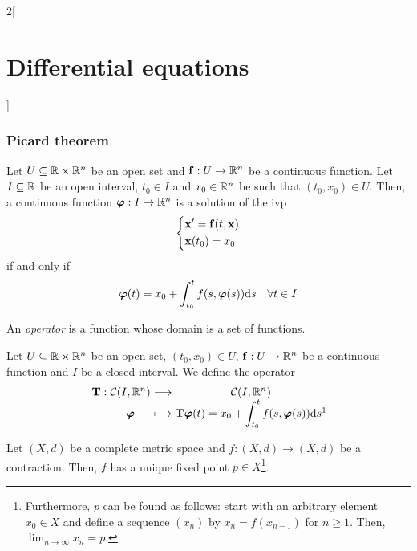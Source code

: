 \documentclass[../../../main.tex]{subfiles}
\begin{document}
\begin{multicols}{2}[\section{Differential equations}]
  \subsubsection{Picard theorem}
  \begin{prop}
    Let $U\subseteq\mathbb{R}\times\mathbb{R}^n$ be an open set and $\boldsymbol{\mathrm{f}}:U\rightarrow\mathbb{R}^n$ be a continuous function. Let $I\subseteq\mathbb{R}$ be an open interval, $t_0\in I$ and $x_0\in\mathbb{R}^n$ be such that $(t_0,x_0)\in U$. Then, a continuous function $\boldsymbol{\mathrm{\varphi}}:I\rightarrow\mathbb{R}^n$ is a solution of the ivp
    \begin{equation}
      \left\{
      \begin{aligned}
         & \boldsymbol{\mathrm{x}}'=\boldsymbol{\mathrm{f}}(t,\boldsymbol{\mathrm{x}}) \\
         & \boldsymbol{\mathrm{x}}(t_0)=x_0
      \end{aligned}
      \right.
      \label{DE_ivp}
    \end{equation}
    if and only if $$\boldsymbol{\mathrm{\varphi}}(t)=x_0+\int_{t_0}^tf(s,\boldsymbol{\mathrm{\varphi}}(s))\dd s\quad\forall t\in I$$
  \end{prop}
  \begin{definition}
    An \textit{operator} is a function whose domain is a set of functions.
  \end{definition}
  \begin{definition}
    Let $U\subseteq\mathbb{R}\times\mathbb{R}^n$ be an open set, $(t_0,x_0)\in U$, $\boldsymbol{\mathrm{f}}:U\rightarrow\mathbb{R}^n$ be a continuous function and $I$ be a closed interval. We define the operator
    $$
      \function{\vectorfunction{T}}
      {\mathcal{C}(I,\RR^n)}
      {\mathcal{C}(I,\RR^n)}
      {\vectorfunction{\varphi}}
      {\displaystyle\vectorfunction{T}\vectorfunction{\varphi}(t)=x_0+\int_{t_0}^tf(s,\vectorfunction{\varphi}(s))\dd s\footnotemark}
    $$
  \end{definition}
  \begin{theorem}
    Let $(X,d)$ be a complete metric space and $f:(X,d)\rightarrow (X,d)$ be a contraction. Then, $f$ has a unique fixed point $p\in X$\footnote{Furthermore, $p$ can be found as follows: start with an arbitrary element $x_0\in X$ and define a sequence $(x_n)$ by $x_n=f(x_{n-1})$ for $n\geq 1$. Then, $\displaystyle\lim_{n\to\infty} x_n=p$.}.
  \end{theorem}
  \begin{corollary}

\end{corollary}
\end{multicols}
\end{document}
